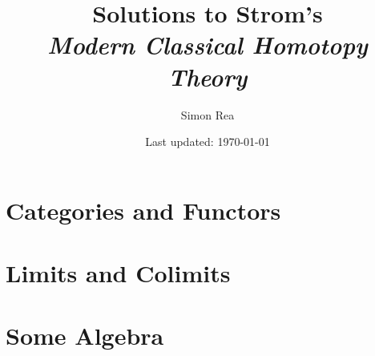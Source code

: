 \documentclass[12pt,twoside]{book}
\title{Solutions to Strom's\\\textit{Modern Classical Homotopy Theory}}
\author{Simon Rea}
\date{Last updated: \today}
\theoremstyle{definition}
\theoremstyle{remark}
\begin{document}
\maketitle
\tableofcontents

\chapter{Categories and Functors}


\chapter{Limits and Colimits}


\appendix
\chapter{Some Algebra}

\end{document}
